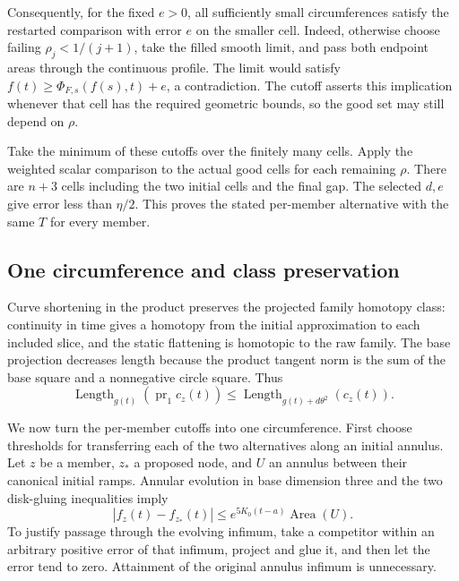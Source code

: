 Consequently, for the fixed $e>0$, all sufficiently small circumferences
satisfy the restarted comparison with error $e$ on the smaller cell.
Indeed, otherwise choose failing $\rho_j<1/(j+1)$, take the filled smooth
limit, and pass both endpoint areas through the continuous profile.  The
limit would satisfy $f(t)\ge\Phi_{F,s}(f(s),t)+e$, a contradiction.
The cutoff asserts this implication whenever that cell has the required
geometric bounds, so the good set may still depend on $\rho$.

Take the minimum of these cutoffs over the finitely many cells.  Apply the
weighted scalar comparison to the actual good cells for each remaining
$\rho$.  There are $n+3$ cells including the two initial cells and the
final gap.  The selected $d,e$ give error less than $\eta/2$.  This proves
the stated per-member alternative with the same $T$ for every member.

\subsection{One circumference and class preservation}
\label{sec:terminal-transfer}

\begin{lemma}\label{lem:annular-family-class}
Curve shortening in the product preserves the projected family homotopy
class: continuity in time gives a homotopy from the initial approximation to
each included slice, and the static flattening is homotopic to the raw family.
The base projection decreases length because the product tangent norm is the
sum of the base square and a nonnegative circle square.  Thus
\begin{equation}
 \operatorname{Length}_{g(t)}(\operatorname{pr}_1 c_z(t))
 \le \operatorname{Length}_{g(t)+d\theta^2}(c_z(t)).
 \label{eq:projection-length}
\end{equation}
\end{lemma}

We now turn the per-member cutoffs into one circumference.  First choose
thresholds for transferring each of the two alternatives along an initial
annulus.  Let $z$ be a member, $z_*$ a proposed node, and $U$ an annulus between
their canonical initial ramps.  Annular evolution in base dimension three
and the two disk-gluing inequalities imply
\[
 |f_z(t)-f_{z_*}(t)|\le e^{5K_0(t-a)}\operatorname{Area}(U).
\]
To justify passage through the evolving infimum, take a competitor within
an arbitrary positive error of that infimum, project and glue it, and then
let the error tend to zero.  Attainment of the original annulus infimum is
unnecessary.

